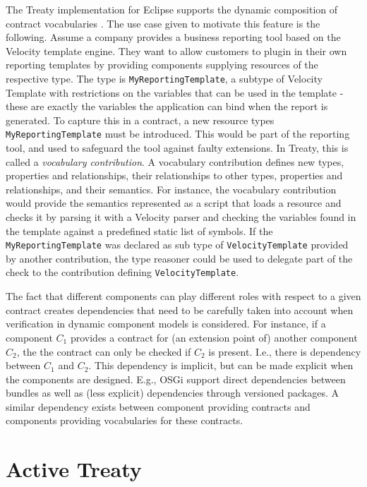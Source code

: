 \documentclass{llncs}
\begin{document}
The Treaty implementation for Eclipse supports the dynamic composition of contract vocabularies \cite{Treaty.JOT2009}. The use case given to motivate this feature is the following. Assume a company provides a business reporting tool based
on the Velocity template engine. They want to allow customers to plugin in their own reporting templates by providing components supplying resources of the respective type. The type is \texttt{MyReportingTemplate}, a subtype of Velocity Template with restrictions on the variables that can be used in the template - these are exactly the variables the application can bind when the report is generated. To capture this  in a contract, a new resource types \texttt{MyReportingTemplate} must be introduced. This would be part of the reporting tool, and used to safeguard the tool against faulty extensions.  In Treaty, this is called a \textit{vocabulary contribution}. A vocabulary contribution defines new types, properties and relationships, their relationships to other types, properties and relationships, and their semantics. For instance, the vocabulary contribution would provide the semantics represented as a script that loads a resource and checks it by parsing it with a Velocity parser and checking the variables found in the template against a predefined static list of symbols. If the \texttt{MyReportingTemplate} was declared as sub type of \texttt{VelocityTemplate} provided by another contribution, the type reasoner could be used to delegate part of the check to the contribution defining \texttt{VelocityTemplate}. 

The fact that different components can play different roles with respect to a given contract creates dependencies that need to be carefully taken into account when verification in dynamic component models is considered. For instance, if a component $C_1$ provides a contract for (an extension point of) another component $C_2$, the the contract  can only be checked if $C_2$ is present. I.e., there is dependency between $C_1$ and $C_2$. This dependency is implicit,
but can be made explicit when the components are designed. E.g., OSGi support direct dependencies between bundles as well as (less explicit) dependencies through versioned packages. A similar dependency exists between component providing contracts and components providing vocabularies for these contracts. 
 
\section{Active Treaty}
\end{document}

